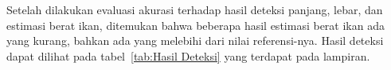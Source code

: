 Setelah dilakukan evaluasi akurasi terhadap hasil deteksi panjang, lebar, dan estimasi berat ikan, ditemukan bahwa beberapa hasil estimasi berat ikan ada yang kurang, bahkan ada yang melebihi dari nilai referensi-nya. Hasil deteksi dapat dilihat pada tabel~\ref{tab:Hasil Deteksi} yang terdapat pada lampiran. %




